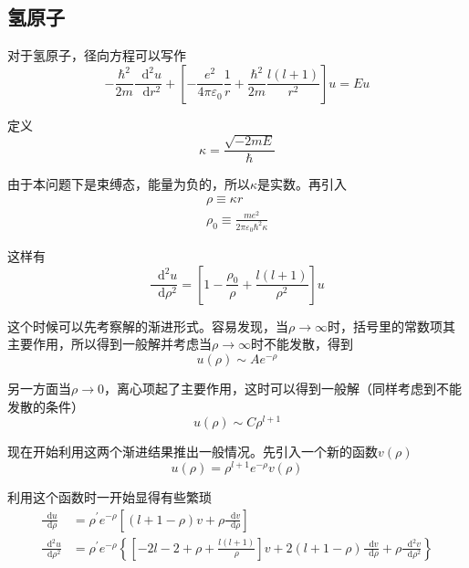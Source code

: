 \documentclass[UTF8]{ctexart}
\begin{document}
    \subsection{氢原子}
    对于氢原子，径向方程可以写作
    \begin{equation}
        -\frac{\hbar^2}{2m} \frac{\mathop{}\!\mathrm{d}^2 u}{\mathop{}\!\mathrm{d} r^2} + \left[-\frac{e^2}{4 \pi \varepsilon_0} \frac{1}{r} + \frac{\hbar^2}{2m} \frac{l(l+1)}{r^2}\right] u =Eu
    \end{equation}

\noindent 定义
\begin{equation}
    \kappa = \frac{\sqrt{-2mE}}{\hbar} \label{equ4.12}
\end{equation}

\noindent 由于本问题下是束缚态，能量为负的，所以$\kappa$是实数。再引入
\begin{equation}
    \begin{aligned}
        \rho \equiv \kappa r \\
        \rho_0 \equiv \frac{me^2}{2 \pi \varepsilon_0 \hbar^2 \kappa}
    \end{aligned} \label{equ4.13}
\end{equation}

\noindent 这样有 
\begin{equation}
    \frac{\mathop{}\!\mathrm{d}^2 u}{\mathop{}\!\mathrm{d} \rho^2} = \left[1 - \frac{\rho_0}{\rho} + \frac{l(l+1)}{\rho^2}\right]u
\end{equation}

    这个时候可以先考察解的渐进形式。容易发现，当$\rho \to \infty$时，括号里的常数项其主要作用，所以得到一般解并考虑当$\rho \to \infty$时不能发散，得到
    \begin{equation}
        u(\rho) \sim Ae^{-\rho}
    \end{equation}

    另一方面当$\rho \to 0$，离心项起了主要作用，这时可以得到一般解（同样考虑到不能发散的条件）
    \begin{equation}
        u(\rho) \sim C \rho^{l+1}
    \end{equation}

    现在开始利用这两个渐进结果推出一般情况。先引入一个新的函数$v(\rho)$
    \begin{equation}
        u(\rho) = \rho^{l+1} e^{-\rho} v(\rho)
    \end{equation}

\noindent 利用这个函数时一开始显得有些繁琐
\begin{equation}
\begin{aligned} \frac{\mathop{}\!\mathrm{d}  u}{\mathop{}\!\mathrm{d} \rho} &=\rho^{\prime} e^{-\rho}\left[(l+1-\rho) v+\rho \frac{\mathop{}\!\mathrm{d} v}{\mathop{}\!\mathrm{d} \rho}\right] \\ \frac{\mathop{}\!\mathrm{d}^{2} u}{\mathop{}\!\mathrm{d} \rho^{2}} &=\rho^{\prime} e^{-\rho}\left\{\left[-2 l-2+\rho+\frac{l(l+1)}{\rho}\right] v+2(l+1-\rho) \frac{\mathop{}\!\mathrm{d} v}{\mathop{}\!\mathrm{d} \rho}+\rho \frac{\mathop{}\!\mathrm{d}^{2} v}{\mathop{}\!\mathrm{d} \rho^{2}}\right\} \end{aligned}
\end{equation}
\end{document}
